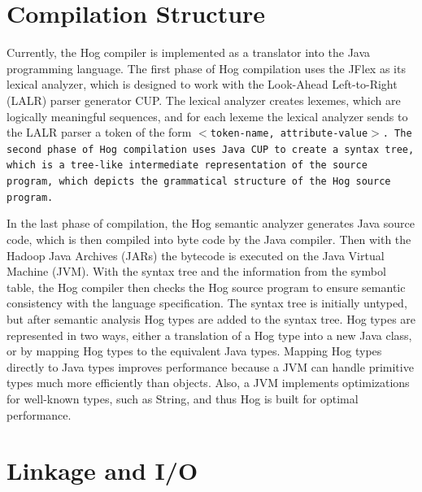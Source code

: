 \documentclass{report}
\begin{document}

\section{Compilation Structure} %
\label{sec:parsing_tools}

Currently, the Hog compiler is implemented as a translator into the Java
programming language. The first phase of Hog compilation uses the JFlex as its
lexical analyzer, which is designed to work with the Look-Ahead Left-to-Right
(LALR) parser generator CUP. The lexical analyzer creates lexemes, which are
logically meaningful sequences, and for each lexeme the lexical analyzer sends
to the LALR parser a token of the form \tt $<$token-name,
attribute-value$>$\rm. The second phase of Hog compilation uses Java CUP to
create a syntax tree, which is a tree-like intermediate representation of the
source program, which depicts the grammatical structure of the Hog source
program.

In the last phase of compilation, the Hog semantic analyzer generates Java source
code, which is then compiled into byte code by the Java compiler. Then with the
Hadoop Java Archives (JARs) the bytecode is executed on the Java Virtual Machine
(JVM). With the syntax tree and the information from the symbol table, the Hog
compiler then checks the Hog source program to ensure semantic consistency with
the language specification. The syntax tree is initially untyped, but after
semantic analysis Hog types are added to the syntax tree. Hog types are
represented in two ways, either a translation of a Hog type into a new Java class,
or by mapping Hog types to the equivalent Java types. Mapping Hog types directly
to Java types improves performance because a JVM can handle primitive types much
more efficiently than objects. Also, a JVM implements optimizations for well-known
types, such as String, and thus Hog is built for optimal performance.


\section{Linkage and I/O} %
\label{sec:linkage_and_i_o}
\end{document}
